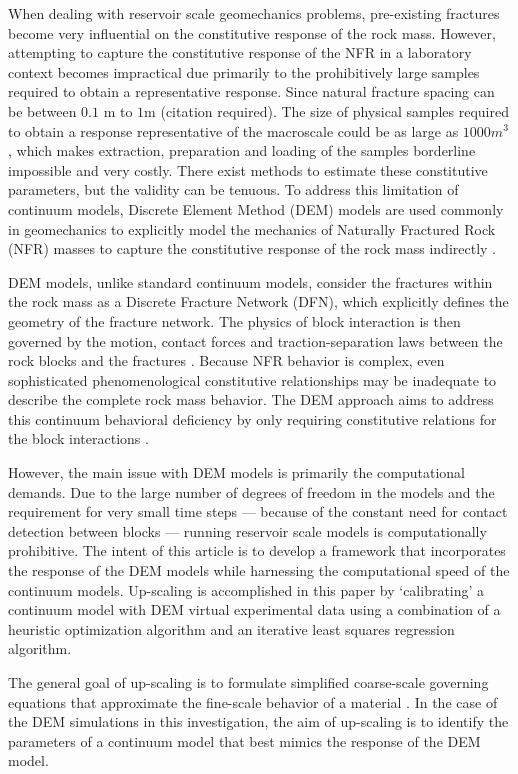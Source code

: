 When dealing with reservoir scale geomechanics problems, pre-existing fractures become very influential on the constitutive response of the rock mass. However, attempting to capture the constitutive response of the NFR in a laboratory context becomes impractical due primarily to the prohibitively large samples required to obtain a representative response. Since natural fracture spacing can be between $0.1$ m to $1$m (citation required). The size of physical samples required to obtain a response representative of the macroscale could be as large as $1000 m^3$, which makes extraction, preparation and loading of the samples borderline impossible and very costly. There exist methods to estimate these constitutive parameters, but the validity can be tenuous. To address this limitation of continuum models, Discrete Element Method (DEM) models are used commonly in geomechanics to explicitly model the mechanics of Naturally Fractured Rock (NFR) masses to capture the constitutive response of the rock mass indirectly \citep{jing_review_2003}. 

DEM models, unlike standard continuum models, consider the fractures within the rock mass as a Discrete Fracture Network (DFN), which explicitly defines the geometry of the fracture network. The physics of block interaction is then governed by the motion, contact forces and traction-separation laws between the rock blocks and the fractures \citep{Cundall_1979}. Because NFR behavior is complex, even sophisticated phenomenological constitutive relationships may be inadequate to describe the complete rock mass behavior. The DEM approach aims to address this continuum behavioral deficiency by only requiring constitutive relations for the block interactions \citep{Cundall_2001}.

However, the main issue with DEM models is primarily the computational demands. Due to the large number of degrees of freedom in the models and the requirement for very small time steps — because of the constant need for contact detection between blocks — running reservoir scale models is computationally prohibitive. The intent of this article is to develop a framework that incorporates the response of the DEM models while harnessing the computational speed of the continuum models. Up-scaling is accomplished in this paper by ‘calibrating’ a continuum model with DEM virtual experimental data using a combination of a heuristic optimization algorithm and an iterative least squares regression algorithm.

The general goal of up-scaling is to formulate simplified coarse-scale governing equations that approximate the fine-scale behavior of a material \citep{Geers_2010}. In the case of the DEM simulations in this investigation, the aim of up-scaling is to identify the parameters of a continuum model that best mimics the response of the DEM model.


